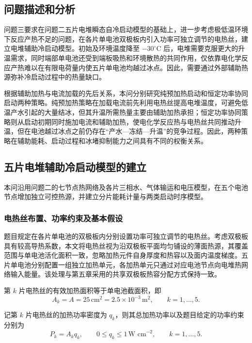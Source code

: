 \documentclass[bwprint]{gmcmthesis}
\numberwithin{equation}{section}
\numberwithin{figure}{section}
\begin{document}
\subsection{问题描述和分析}

问题三要求在问题二五片电堆瞬态自冷启动模型的基础上，进一步考虑极低温环境下反应产热不足的问题，在各片单电池双极板内引入功率可独立调节的电热丝，建立电堆辅助冷启动模型。初始及环境温度降至 \(-30^\circ\mathrm C\) 后，电堆需要克服更大的升温需求，同时端部单电池还受到端板吸热和环境散热的共同作用，仅依靠电化学反应产热难以在有限电荷量内使五片单电池均越过冰点。因此，需要通过外部辅助热源弥补冷启动过程中的热量缺口。

根据辅助加热与电流加载的先后关系，本问分别研究纯预加热启动和恒定功率协同启动两种策略。纯预加热策略在加载电流前先利用电热丝提高电堆温度，可避免低温产水引起的大量结冰，但其升温所需热量主要由辅助加热承担；恒定功率协同策略则从启动初期同时施加电流和辅助加热，使电化学反应热与电热丝共同推动升温，但在电池越过冰点之前仍存在“产水—冻结—升温”的竞争过程。因此，两种策略在辅助能耗、启动过程和冰堵抑制能力之间具有不同的权衡关系。

\subsection{五片电堆辅助冷启动模型的建立}

本问沿用问题二的七节点热网络及各片三相水、气体输运和电压模型，在五个电池节点增加独立可控热源，并建立分片能耗计量与两类启动时序模型。
\subsubsection{电热丝布置、功率约束及基本假设}
题目规定在各片单电池的双极板内分别设置功率可独立调节的电热丝。考虑双极板具有较高导热系数，本文将电热丝视为沿双极板平面均匀铺设的薄面热源，其覆盖范围与单电池活化面积一致，忽略加热元件自身厚度和热容以及面内温度梯度。五片单电池分别配置一组独立加热单元，各加热单元只通过对应电池节点向电堆热网络输入能量。该处理与第五章采用的共享双极板热容分配方式保持一致。

 第 \(k\) 片电热丝的有效加热面积等于单电池截面积，即
\begin{equation}
A_k = A = 25 \, \text{cm}^2 = 2.5 \times 10^{-3} \, \text{m}^2, \qquad k = 1, \dots, 5. \label{eq:src:6-1}
\end{equation}

 记第 \(k\) 片电热丝的加热功率密度为 \(q_k\)，则其总加热功率以及题目给定的功率约束分别为
\begin{equation}
P_k = A_k q_k, \qquad 0 \leq q_k \leq 1 \, \text{W cm}^{-2}, \qquad k = 1, \dots, 5. \label{eq:src:6-2}
\end{equation}
\end{document}
